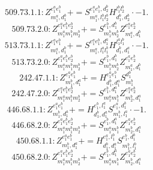 \documentclass[letterpaper,10pt,fleqn,leqno,onecolumn]{article}
\begin{document}
\begin{equation} \;\;\;\;\;\;  509.73.1.1: Z^{e_{1}^{a}e_{1}^{b}}_{m_{1}^{a},d_{1}^{b}}+=S^{e_{1}^{a}e_{1}^{b},d_{2}^{b}}_{m_{1}^{a},l_{1}^{b}l_{2}^{b}}H^{l_{1}^{b}l_{2}^{b}}_{d_{1}^{b},d_{2}^{b}}\cdot -1. \end{equation}
\begin{equation} \;\;\;\;\;\;  509.73.2.0: Z^{e_{1}^{a}e_{1}^{b}e_{2}^{b}}_{m_{1}^{a}m_{1}^{b}m_{2}^{b}}+=S^{e_{1}^{b},d_{1}^{b}}_{m_{1}^{b}m_{2}^{b}}Z^{e_{1}^{a}e_{2}^{b}}_{m_{1}^{a},d_{1}^{b}} \end{equation}
\begin{equation} \;\;\;\;\;\;  513.73.1.1: Z^{e_{1}^{a}e_{1}^{b}}_{m_{1}^{a},d_{1}^{b}}+=S^{e_{1}^{a}e_{1}^{b},d_{1}^{a}}_{m_{1}^{a},l_{1}^{a}l_{1}^{b}}H^{l_{1}^{a}l_{1}^{b}}_{d_{1}^{b},d_{1}^{a}}\cdot -1. \end{equation}
\begin{equation} \;\;\;\;\;\;  513.73.2.0: Z^{e_{1}^{a}e_{1}^{b}e_{2}^{b}}_{m_{1}^{a}m_{1}^{b}m_{2}^{b}}+=S^{e_{1}^{b},d_{1}^{b}}_{m_{1}^{b}m_{2}^{b}}Z^{e_{1}^{a}e_{2}^{b}}_{m_{1}^{a},d_{1}^{b}} \end{equation}
\begin{equation} \;\;\;\;\;\;  242.47.1.1: Z^{e_{1}^{a}e_{1}^{b}}_{m_{1}^{b},d_{1}^{a}}+=H^{e_{1}^{a}e_{1}^{b}}_{d_{1}^{b},d_{1}^{a}}S^{d_{1}^{b}}_{m_{1}^{b}} \end{equation}
\begin{equation} \;\;\;\;\;\;  242.47.2.0: Z^{e_{1}^{a}e_{1}^{b}e_{2}^{b}}_{m_{1}^{a}m_{1}^{b}m_{2}^{b}}+=S^{e_{1}^{b},d_{1}^{a}}_{m_{1}^{a}m_{1}^{b}}Z^{e_{1}^{a}e_{2}^{b}}_{m_{2}^{b},d_{1}^{a}} \end{equation}
\begin{equation} \;\;\;\;\;\;  446.68.1.1: Z^{e_{1}^{a}e_{1}^{b}}_{m_{1}^{b},d_{1}^{a}}+=H^{e_{1}^{b},l_{1}^{a}}_{d_{1}^{b},d_{1}^{a}}S^{e_{1}^{a},d_{1}^{b}}_{m_{1}^{b},l_{1}^{a}}\cdot -1. \end{equation}
\begin{equation} \;\;\;\;\;\;  446.68.2.0: Z^{e_{1}^{a}e_{1}^{b}e_{2}^{b}}_{m_{1}^{a}m_{1}^{b}m_{2}^{b}}+=S^{e_{1}^{b},d_{1}^{a}}_{m_{1}^{a}m_{1}^{b}}Z^{e_{1}^{a}e_{2}^{b}}_{m_{2}^{b},d_{1}^{a}} \end{equation}
\begin{equation} \;\;\;\;\;\;  450.68.1.1: Z^{e_{1}^{a}e_{1}^{b}}_{m_{1}^{b},d_{1}^{a}}+=H^{e_{1}^{a},l_{1}^{b}}_{d_{1}^{b},d_{1}^{a}}S^{e_{1}^{b},d_{1}^{b}}_{m_{1}^{b},l_{1}^{b}} \end{equation}
\begin{equation} \;\;\;\;\;\;  450.68.2.0: Z^{e_{1}^{a}e_{1}^{b}e_{2}^{b}}_{m_{1}^{a}m_{1}^{b}m_{2}^{b}}+=S^{e_{1}^{b},d_{1}^{a}}_{m_{1}^{a}m_{1}^{b}}Z^{e_{1}^{a}e_{2}^{b}}_{m_{2}^{b},d_{1}^{a}} \end{equation}
\end{document}
